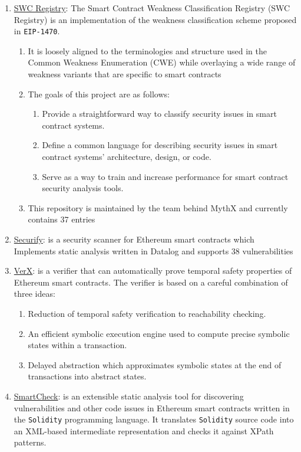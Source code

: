 \begin{enumerate}
\item\href{https://github.com/SmartContractSecurity/SWC-registry}{SWC Registry}: The Smart Contract Weakness Classification Registry (SWC Registry) is an implementation of the weakness classification scheme proposed in \verb|EIP-1470|.
	\begin{enumerate}
	\item It is loosely aligned to the terminologies and structure used in the Common Weakness Enumeration (CWE) while overlaying a wide range of weakness variants that are specific to smart contracts
	\item The goals of this project are as follows:
	    \begin{enumerate}
	    \item Provide a straightforward way to classify security issues in smart contract systems.
	    \item Define a common language for describing security issues in smart contract systems' architecture, design, or code.
	    \item Serve as a way to train and increase performance for smart contract security analysis tools.
	    \end{enumerate}
	\item This repository is maintained by the team behind MythX and currently contains 37 entries
	\end{enumerate}

\item\href{https://github.com/eth-sri/securify2}{Securify}: is a security scanner for Ethereum smart contracts which Implements static analysis written in Datalog and supports 38 vulnerabilities

\item\href{https://verx.ch/}{VerX}: is a verifier that can automatically prove temporal safety properties of Ethereum smart contracts. The verifier is based on a careful combination of three ideas:
    \begin{enumerate}
    \item Reduction of temporal safety verification to reachability checking.
    \item An efficient symbolic execution engine used to compute precise symbolic states within a transaction.
    \item Delayed abstraction which approximates symbolic states at the end of transactions into abstract states.
    \end{enumerate}

\item\href{https://github.com/smartdec/smartcheck}{SmartCheck}: is an extensible static analysis tool for discovering vulnerabilities and other code issues in Ethereum smart contracts written in the \verb|Solidity| programming language. It translates \verb|Solidity| source code into an XML-based intermediate representation and checks it against XPath patterns.


\end{enumerate}
